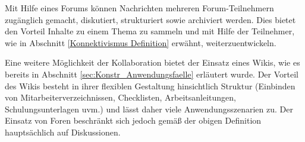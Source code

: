 Mit Hilfe eines Forums können Nachrichten mehreren Forum-Teilnehmern zugänglich gemacht, diskutiert, strukturiert sowie archiviert werden. Dies bietet den Vorteil Inhalte zu einem Thema zu sammeln und mit Hilfe der Teilnehmer, wie in Abschnitt \ref{Konnektivismus Definition} erwähnt, weiterzuentwickeln.\cite[S. 67f.]{Drummer.2011}

Eine weitere Möglichkeit der Kollaboration bietet der Einsatz eines Wikis, wie es bereits in Abschnitt \ref{sec:Konstr_Anwendungsfaelle} erläutert wurde. Der Vorteil des Wikis besteht in ihrer flexiblen Gestaltung hinsichtlich Struktur (Einbinden von Mitarbeiterverzeichnissen, Checklisten, Arbeitsanleitungen, Schulungsunterlagen uvm.) und lässt daher viele Anwendungsszenarien zu.\cite[S. 77]{Mertins.2009} Der Einsatz von Foren beschränkt sich jedoch gemäß der obigen Definition hauptsächlich auf Diskussionen.